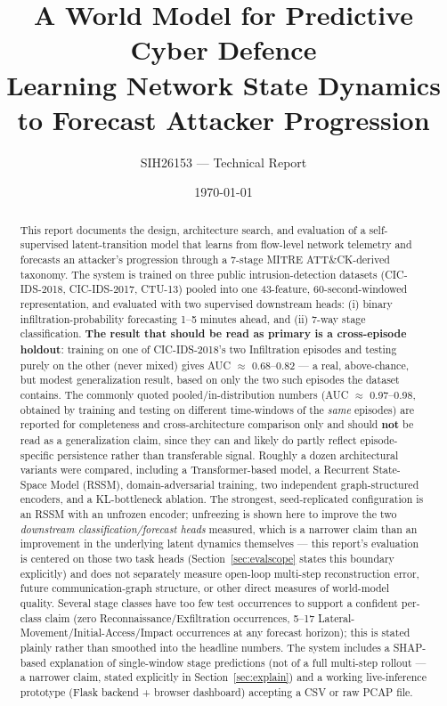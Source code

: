 \documentclass[11pt]{article}
\title{\textbf{A World Model for Predictive Cyber Defence}\\
\large Learning Network State Dynamics to Forecast Attacker Progression}
\author{SIH26153 --- Technical Report}
\date{\today}
\begin{document}
\maketitle
\thispagestyle{empty}

\begin{abstract}
\noindent
This report documents the design, architecture search, and evaluation of a self-supervised
latent-transition model that learns from flow-level network telemetry and forecasts an
attacker's progression through a 7-stage MITRE ATT\&CK-derived taxonomy. The system is trained
on three public intrusion-detection datasets (CIC-IDS-2018, CIC-IDS-2017, CTU-13) pooled into
one 43-feature, 60-second-windowed representation, and evaluated with two supervised
downstream heads: (i) binary infiltration-probability forecasting 1--5 minutes ahead, and (ii)
7-way stage classification. \textbf{The result that should be read as primary is a cross-episode
holdout}: training on one of CIC-IDS-2018's two Infiltration episodes and testing purely on the
other (never mixed) gives AUC $\approx$ 0.68--0.82 --- a real, above-chance, but modest
generalization result, based on only the two such episodes the dataset contains. The commonly
quoted pooled/in-distribution numbers (AUC $\approx$ 0.97--0.98, obtained by training and
testing on different time-windows of the \emph{same} episodes) are reported for completeness
and cross-architecture comparison only and should \textbf{not} be read as a generalization
claim, since they can and likely do partly reflect episode-specific persistence rather than
transferable signal. Roughly a dozen architectural variants were compared, including a
Transformer-based model, a Recurrent State-Space Model (RSSM), domain-adversarial training, two
independent graph-structured encoders, and a KL-bottleneck ablation. The strongest,
seed-replicated configuration is an RSSM with an unfrozen encoder; unfreezing is shown here to
improve the two \emph{downstream classification/forecast heads} measured, which is a narrower
claim than an improvement in the underlying latent dynamics themselves --- this report's
evaluation is centered on those two task heads (Section~\ref{sec:evalscope} states this
boundary explicitly) and does not separately measure open-loop multi-step reconstruction error,
future communication-graph structure, or other direct measures of world-model quality. Several
stage classes have too few test occurrences to support a confident per-class claim (zero
Reconnaissance/Exfiltration occurrences, 5--17 Lateral-Movement/Initial-Access/Impact
occurrences at any forecast horizon); this is stated plainly rather than smoothed into the
headline numbers. The system includes a SHAP-based explanation of single-window stage
predictions (not of a full multi-step rollout --- a narrower claim, stated explicitly in
Section~\ref{sec:explain}) and a working live-inference prototype (Flask backend + browser
dashboard) accepting a CSV or raw PCAP file.
\end{abstract}
\end{document}
